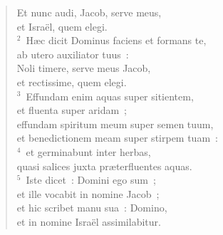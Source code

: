 \begin{flushleft}\begin{verse}\vspace{-19pt}\hspace{6pt}Et nunc audi, Jacob, serve meus,\\\hspace{6pt} et Isra\"el, quem elegi.\\
${}^{2}$~H\ae c dicit Dominus faciens et formans te,\\ ab utero auxiliator tuus~:\\ Noli timere, serve meus Jacob,\\ et rectissime, quem elegi.\\
${}^{3}$~Effundam enim aquas super sitientem,\\ et fluenta super aridam~;\\ effundam spiritum meum super semen tuum,\\ et benedictionem meam super stirpem tuam~:\\
${}^{4}$~et germinabunt inter herbas,\\ quasi salices juxta pr\ae terfluentes aquas.\\
${}^{5}$~Iste dicet~: Domini ego sum~;\\ et ille vocabit in nomine Jacob~;\\ et hic scribet manu sua~: Domino,\\ et in nomine Isra\"el assimilabitur.\end{verse}\end{flushleft}


